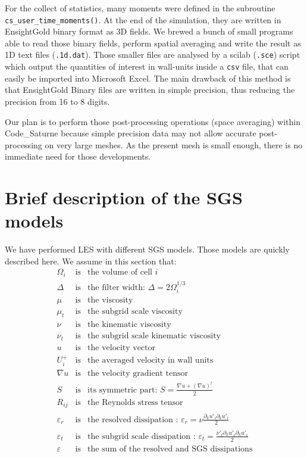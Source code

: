 \documentclass[a4paper]{article}
\newcommand{\CS}{%
   {\fontfamily{ppl}\fontshape{it}\selectfont Code\_Saturne}\xspace}
\begin{document}
For the collect of statistics, many moments were defined in the subroutine \verb!cs_user_time_moments()!. At the end of the simulation, they are written in EnsightGold binary format as 3D fields. We brewed a bunch of small programs able to read those binary fields, perform spatial averaging and write the result as 1D text files (\verb!.1d.dat!). Those smaller files are analysed by a scilab (\verb!.sce!) script which output the quantities of interest in wall-units inside a \verb!csv! file, that can easily be imported into Microsoft Excel. The main drawback of this method is that EnsightGold Binary files are written in simple precision, thus reducing the precision from 16 to 8 digits.

Our plan is to perform those post-processing operations (space averaging) within \CS because simple precision data may not allow accurate post-processing on very large meshes. As the present mesh is small enough, there is no immediate need for those developments.

\section{Brief description of the SGS models}
We have performed LES with different SGS models. Those models are quickly described here. We assume in this section that:
\begin{eqnarray}
\Omega_i & \mbox{is} & \mbox{the volume of cell } i \nonumber \\
\Delta & \mbox{is} & \mbox{the filter width: } \Delta = 2 \Omega_i^{1/3} \nonumber \\
\mu & \mbox{is} & \mbox{the viscosity} \nonumber \\
\mu_t & \mbox{is} & \mbox{the subgrid scale viscosity} \nonumber \\
\nu & \mbox{is} & \mbox{the kinematic viscosity} \nonumber \\
\nu_t & \mbox{is} & \mbox{the subgrid scale kinematic viscosity} \nonumber \\
u & \mbox{is} & \mbox{the velocity vector} \nonumber \\
U_i^+ & \mbox{is} & \mbox{the averaged velocity in wall units} \nonumber \\
\nabla u & \mbox{is} & \mbox{the velocity gradient tensor} \nonumber \\
S & \mbox{is} & \mbox{its symmetric part: } S = \frac{\nabla u + \left( \nabla u \right)^t }{2} \nonumber \\
R_{ij} & \mbox{is} & \mbox{the Reynolds stress tensor} \nonumber \\
\varepsilon_r & \mbox{is} & \mbox{the resolved dissipation : } \varepsilon_r = \nu \frac{\overline{\partial_k u'_i \partial_k u'_i}}{2} \nonumber \\
\varepsilon_t & \mbox{is} & \mbox{the subgrid scale dissipation : } \varepsilon_t = \frac{\overline{\nu'_t \partial_k u'_i \partial_k u'_i}}{2} \nonumber \\
\varepsilon & \mbox{is} & \mbox{the sum of the resolved and SGS dissipations} \nonumber \\
\end{eqnarray}
\end{document}
